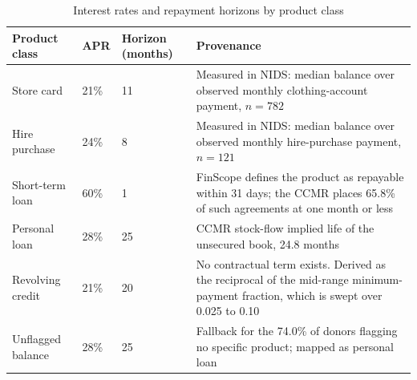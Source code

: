 \begin{table}[tbp]
\centering
\caption{Interest rates and repayment horizons by product class}
\label{tab:credit-terms}
\begin{tabular}{L{2.7cm}L{1.2cm}L{1.9cm}L{5.7cm}}
\toprule
\textbf{Product class} & \textbf{\ac{APR}} & \textbf{Horizon (months)} & \textbf{Provenance} \\
\midrule
Store card & 21\% & 11 & Measured in \ac{NIDS}: median balance over observed monthly clothing-account payment, $n=782$ \cite{nids_w5_2018} \\
\addlinespace
Hire purchase & 24\% & 8 & Measured in \ac{NIDS}: median balance over observed monthly hire-purchase payment, $n=121$ \cite{nids_w5_2018} \\
\addlinespace
Short-term loan & 60\% & 1 & \ac{FinScope} defines the product as repayable within 31 days; the \ac{CCMR} places 65.8\% of such agreements at one month or less \cite{finscope2019, ncr_ccmr_2017} \\
\addlinespace
Personal loan & 28\% & 25 & \ac{CCMR} stock-flow implied life of the unsecured book, 24.8 months \cite{ncr_ccmr_2017} \\
\addlinespace
Revolving credit & 21\% & 20 & No contractual term exists. Derived as the reciprocal of the mid-range minimum-payment fraction, which is swept over 0.025 to 0.10 \\
\addlinespace
Unflagged balance & 28\% & 25 & Fallback for the 74.0\% of donors flagging no specific product; mapped as personal loan \\
\bottomrule
\end{tabular}
\end{table}

